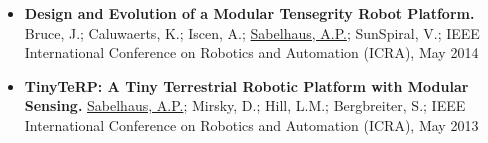 \documentclass[letterpaper]{deedy-resume} %
\begin{document}
\begin{minipage}[t]{1\textwidth}
\begin{itemize}
\item \textbf{Design and Evolution of a Modular Tensegrity Robot Platform.} Bruce, J.; Caluwaerts, K.; Iscen, A.; \underline{Sabelhaus, A.P.}; SunSpiral, V.; IEEE International Conference on Robotics and Automation (ICRA), May 2014

\item \textbf{TinyTeRP: A Tiny Terrestrial Robotic Platform with Modular Sensing.} \underline{Sabelhaus, A.P.}; Mirsky, D.; Hill, L.M.; Bergbreiter, S.; IEEE International Conference on Robotics and Automation (ICRA), May 2013 

\end{itemize}


\end{minipage}%
\newpage %
\end{document}
